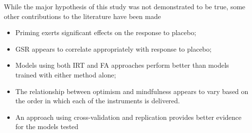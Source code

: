 While the major hypothesis of this study was not demonstrated to be
true, some other contributions to the literature have been made
\begin{itemize}
\item Priming exerts significant effects on the response to placebo;
\item GSR appears to correlate appropriately with response to placebo;
\item Models using both IRT and FA approaches perform better than
models trained with either method alone;
\item The relationship between optimism and mindfulness appears to
vary based on the order in which each of the instruments is delivered.
\item An approach using cross-validation and replication provides
better evidence for the models tested
\end{itemize}

